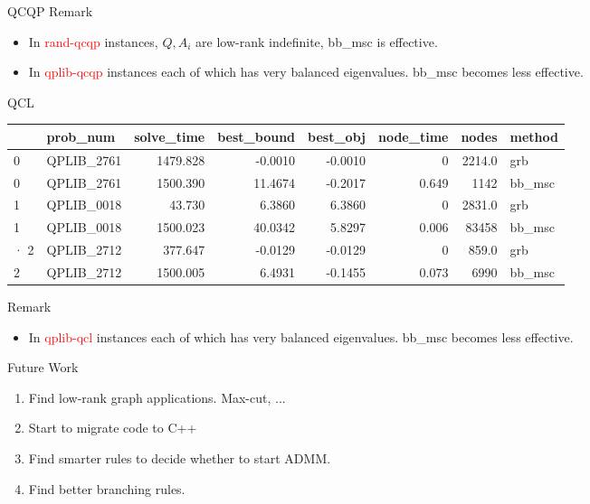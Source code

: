 \documentclass[aspectratio=1610, 9pt]{beamer}
\newcommand{\redsf}[1]{\textcolor{red}{\textsf{#1}}}
\begin{document}
\begin{frame}[standout]{QCQP}
  \normalsize
  Remark
  \begin{itemize}
    \item In \redsf{rand-qcqp} instances, \(Q, A_i\) are low-rank indefinite, bb\_msc is effective.
    \item In \redsf{qplib-qcqp} instances each of which has very balanced eigenvalues. bb\_msc becomes less effective.
  \end{itemize}
\end{frame}

\begin{frame}[standout]{QCL}
  \begin{table}
    \begin{tabular}{llrrrrrl}
      \toprule
      {} & prob\_num   & solve\_time & best\_bound & best\_obj & node\_time & nodes  & method  \\
      \midrule
      0  & QPLIB\_2761 & 1479.828    & -0.0010     & -0.0010   & 0          & 2214.0 & grb     \\
      0  & QPLIB\_2761 & 1500.390    & 11.4674     & -0.2017   & 0.649      & 1142   & bb\_msc \\
      1  & QPLIB\_0018 & 43.730      & 6.3860      & 6.3860    & 0          & 2831.0 & grb     \\
      1  & QPLIB\_0018 & 1500.023    & 40.0342     & 5.8297    & 0.006      & 83458  & bb\_msc \\·
      2  & QPLIB\_2712 & 377.647     & -0.0129     & -0.0129   & 0          & 859.0  & grb     \\
      2  & QPLIB\_2712 & 1500.005    & 6.4931      & -0.1455   & 0.073      & 6990   & bb\_msc \\
      \bottomrule
    \end{tabular}
  \end{table}

  Remark
  \begin{itemize}
    \item In \redsf{qplib-qcl} instances each of which has very balanced eigenvalues. bb\_msc becomes less effective.
  \end{itemize}
\end{frame}


\setlength\pdfpagewidth{16.00cm}%
\setlength\pdfpageheight{10.00cm}%

\begin{frame}[allowframebreaks]{Future Work}
  \begin{enumerate}
    \item Find low-rank graph applications. Max-cut, ...
    \item Start to migrate code to C++
    \item Find smarter rules to decide whether to start ADMM.
    \item Find better branching rules.
  \end{enumerate}
\end{frame}
\end{document}
